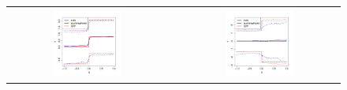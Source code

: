 \documentclass[aos]{imsart}
\theoremstyle{plain}
\theoremstyle{definition}
\theoremstyle{remark}
\newcommand{\FIGW}{0.45}
\begin{document}
\begin{CJK}{UTF8}{gbsn}
{\begin{figure}
\centering
\begin{tabular}{ccc}
\includegraphics[width=\FIGW\textwidth]{quantile_plot_shift_n2k_p40.pdf} & &
\includegraphics[width=\FIGW\textwidth]{quantile_plot_spread_n2k_p40.pdf} \\

\end{tabular}
\end{figure}}
\end{CJK}
\end{document}
